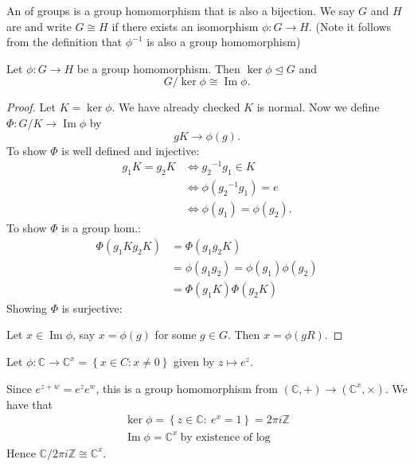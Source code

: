 \documentclass[egregdoesnotlikesansseriftitles,a4paper]{scrartcl}
\begin{document}
\begin{definition*}[Isomorphism]
      An  of groups is a group homomorphism that is also a bijection. We say $G$ and $H$ are  and write $G \cong H$ if there exists an isomorphism $\phi: G \rightarrow H$. (Note it follows from the definition that ${\phi}^{-1}$ is also a group homomorphism)
\end{definition*}
\begin{theorem}
      Let $\phi: G \rightarrow H$ be a group homomorphism. Then $\operatorname{ker}\phi \unlhd G$ and \[
      G/\operatorname{ker}\phi \cong \operatorname{Im} \phi
      .\]
      \begin{proof}
            Let $K=\operatorname{ker} \phi$. We have already checked $K$ is normal. Now we define $\Phi: G/K \rightarrow \operatorname{Im} \phi$ by \[
            gK \rightarrow \phi (g)
            .\]
            To show $\Phi$ is well defined and injective: 
            \begin{align*}
                 g_1 K= g_2 K &\iff {g_2 }^{-1}g_1 \in K\\
                 &\iff \phi ({g_2 }^{-1}g_1 )=e\\
                 &\iff \phi (g_1 )=\phi (g_2 ). 
            \end{align*}
            To show $\Phi$ is a group hom.: 
            \begin{align*}
                 \Phi (g_1 K g_2 K)&=\Phi (g_1 g_2 K)\\
                 &=\phi (g_1 g_2 )=\phi (g_1 ) \phi (g_2 )\\
                 &=\Phi (g_1 K) \Phi (g_2 K)
            \end{align*}
            Showing $\Phi$ is surjective:
      
            Let $x \in \operatorname{Im} \phi$, say $x= \phi (g)$ for some $g \in G$. Then $x=\phi (gR)$.
      \end{proof}
\end{theorem}
\begin{example*}
      Let $\phi: \mathbb{C} \rightarrow \mathbb{C}^x= \left\{x \in C: x \neq 0\right\}$ given by $z \mapsto e^{z}$.

      Since $e^{z+w}=e^{z}e^{w}$, this is a group homomorphism from $(\mathbb{C},+) \rightarrow (\mathbb{C}^{x},\times)$. We have that 
      \begin{align*}
          \operatorname{ker} \phi= \left\{z \in \mathbb{C}: \ e^x=1\right\}=2 \pi i \mathbb{Z}\\
          \operatorname{Im} \phi=\mathbb{C}^{x} \ \text{by existence of log}
      \end{align*}
      Hence $\mathbb{C}/2 \pi i \mathbb{Z} \cong \mathbb{C}^{x}$. 
\end{example*}
\end{document}
